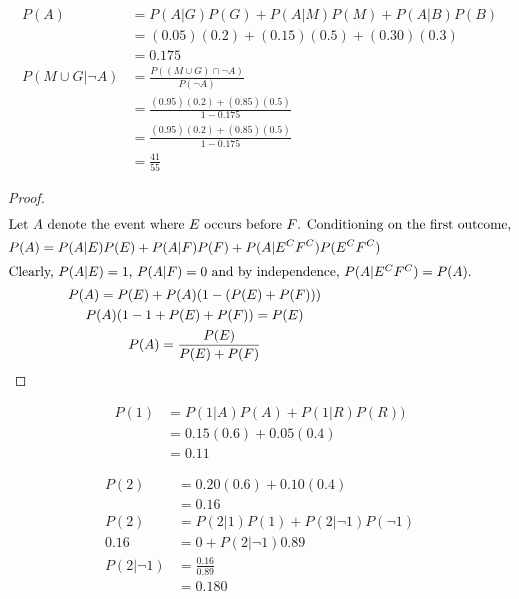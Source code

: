 \documentclass[12pt]{article}
\newenvironment{problem}[2][Problem]{\begin{trivlist}
\item[\hskip \labelsep {\bfseries #1}\hskip \labelsep {\bfseries #2.}]}{\end{trivlist}}
\begin{document}
\begin{problem}{8}
\end{problem}
\begin{align*}
	P(A) &= P(A|G)P(G) + P(A|M)P(M) + P(A|B)P(B) \\
	&= (0.05)(0.2) + (0.15)(0.5) + (0.30)(0.3) \\
	&= 0.175 \\
	P(M \cup G|\neg A) &= \frac{P((M \cup G) \cap \neg A)} {P(\neg A)} \\
	&= \frac{(0.95)(0.2) + (0.85)(0.5)} {1 - 0.175} \\
	&= \frac{(0.95)(0.2) + (0.85)(0.5)} {1 - 0.175} \\
	&= \frac{41}{55}
\end{align*}
\filbreak

\begin{problem}{9}
\end{problem}
\begin{proof}
\begin{gather*}
	\intertext{Let $A$ denote the event where $E$ occurs before $F$. 
		Conditioning on the first outcome,}
	P(A) = P(A|E)P(E) + P(A|F)P(F) + P(A|E^CF^C)P(E^CF^C) \\
	\intertext{Clearly, $P(A|E) = 1$, $P(A|F) = 0$ and by independence, 
		$P(A|E^CF^C) = P(A)$.}
	P(A) = P(E) + P(A)(1 - (P(E) + P(F))) \\
	P(A) (1 - 1 + P(E) + P(F)) = P(E) \\
	P(A) = \frac{P(E)}{P(E) + P(F)} 
\end{gather*}
\end{proof}
\filbreak

\begin{problem}{10.a}
\end{problem}
\begin{align*}
	P(1) &= P(1|A) P(A) + P(1|R) P(R)) \\
	&= 0.15(0.6) + 0.05(0.4) \\
	&= 0.11
\end{align*}
\filbreak

\begin{problem}{10.b}
\end{problem}
\begin{align*}
	P(2) &= 0.20(0.6) + 0.10(0.4) \\
	&= 0.16 \\
	P(2) &= P(2|1) P(1) + P(2|\neg1) P(\neg1)\\
	0.16 &= 0 + P(2|\neg1) 0.89 \\
	P(2|\neg1) &= \frac{0.16}{0.89} \\
	&= 0.180
\end{align*}
\filbreak
\end{document}
